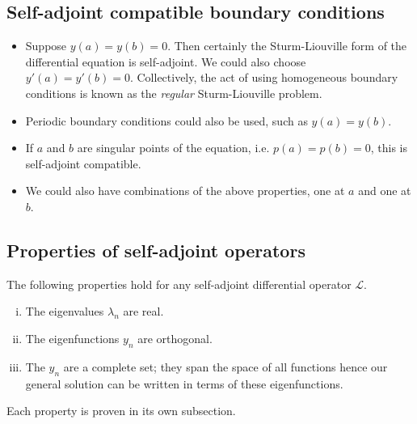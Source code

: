\subsection{Self-adjoint compatible boundary conditions}
\begin{itemize}
	\item Suppose \( y(a) = y(b) = 0 \).
	      Then certainly the Sturm-Liouville form of the differential equation is self-adjoint.
	      We could also choose \( y'(a) = y'(b) = 0 \).
	      Collectively, the act of using homogeneous boundary conditions is known as the \textit{regular} Sturm-Liouville problem.
	\item Periodic boundary conditions could also be used, such as \( y(a) = y(b) \).
	\item If \( a \) and \( b \) are singular points of the equation, i.e.
	      \( p(a) = p(b) = 0 \), this is self-adjoint compatible.
	\item We could also have combinations of the above properties, one at \( a \) and one at \( b \).
\end{itemize}

\subsection{Properties of self-adjoint operators}
The following properties hold for any self-adjoint differential operator \( \mathcal L \).
\begin{enumerate}[(i)]
	\item The eigenvalues \( \lambda_n \) are real.
	\item The eigenfunctions \( y_n \) are orthogonal.
	\item The \( y_n \) are a complete set; they span the space of all functions hence our general solution can be written in terms of these eigenfunctions.
\end{enumerate}
Each property is proven in its own subsection.

